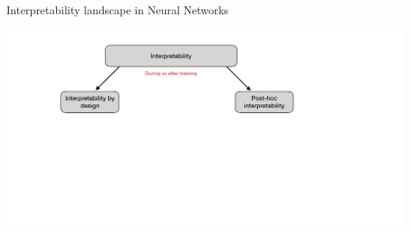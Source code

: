 \documentclass[11pt,compress,t,notes=noshow, aspectratio=169, xcolor=table]{beamer}
\begin{document}
	
	

\begin{frame}[c]{Interpretability landscape in Neural Networks}
    
    \includegraphics[scale=.4]{baum1}
\end{frame}
\end{document}
